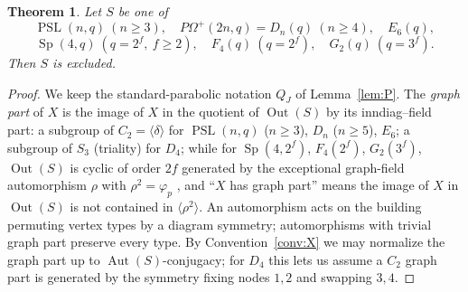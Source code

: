 \documentclass[11pt]{amsart}
\newtheorem{theorem}{Theorem}[section]
\theoremstyle{definition}
\theoremstyle{remark}
\DeclareMathOperator{\Aut}{Aut}
\DeclareMathOperator{\Out}{Out}
\DeclareMathOperator{\PSL}{PSL}
\DeclareMathOperator{\Sp}{Sp}
\begin{document}
\begin{theorem}\label{thm:graph}
Let $S$ be one of
\[
\PSL(n,q)\ (n\geq3),\quad P\Omega^+(2n,q)=D_n(q)\ (n\geq4),\quad
E_6(q),
\]
\[
\Sp(4,q)\ (q=2^f,\ f\geq2),\quad F_4(q)\ (q=2^f),\quad
G_2(q)\ (q=3^f).
\]
Then $S$ is excluded.
\end{theorem}

\begin{proof}
We keep the standard-parabolic notation $Q_J$ of Lemma~\ref{lem:P}. The
\emph{graph part} of $X$ is the image of $X$ in the quotient of
$\Out(S)$ by its inndiag--field part: a subgroup of
$C_2=\langle\delta\rangle$ for $\PSL(n,q)$ ($n\geq3$), $D_n$ ($n\geq5$),
$E_6$; a subgroup of $S_3$ (triality) for $D_4$; while for $\Sp(4,2^f)$,
$F_4(2^f)$, $G_2(3^f)$, $\Out(S)$ is cyclic of order $2f$ generated by
the exceptional graph-field automorphism $\rho$ with $\rho^2=\varphi_p$
\cite[Thm.~2.5.12]{GLS3}, and ``$X$ has graph part'' means the image of
$X$ in $\Out(S)$ is not contained in $\langle\rho^2\rangle$. An
automorphism acts on the building permuting vertex types by a diagram
symmetry; automorphisms with trivial graph part preserve every type. By
Convention~\ref{conv:X} we may normalize the graph part up to
$\Aut(S)$-conjugacy; for $D_4$ this lets us assume a $C_2$ graph part is
generated by the symmetry fixing nodes $1,2$ and swapping $3,4$.


\end{proof}
\end{document}
